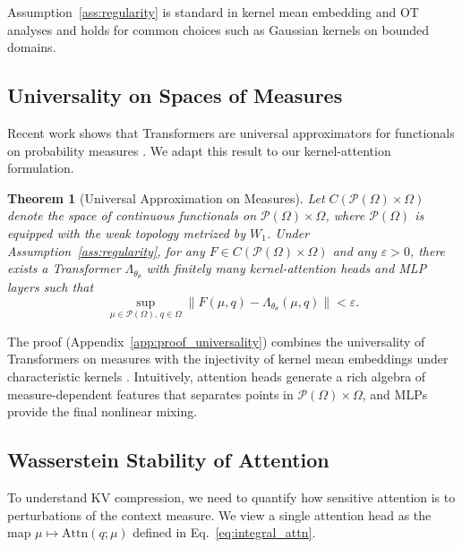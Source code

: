 \documentclass{article}
\theoremstyle{plain}
\newtheorem{theorem}{Theorem}[section]
\theoremstyle{definition}
\theoremstyle{remark}
\newcommand{\OmegaSpace}{\Omega} %
\newcommand{\Pspace}{\mathcal{P}(\OmegaSpace)} %
\newcommand{\Wass}[1]{W_{#1}} %
\newcommand{\Attn}{\text{Attn}}
\newcommand{\LambdaOp}{\Lambda_{\theta}} %
\begin{document}
Assumption~\ref{ass:regularity} is standard in kernel mean embedding and OT analyses  
\citep{muandet2017kernel,sriperumbudur2010hilbert,villani2009optimal,castin2024how} and holds for common choices such as Gaussian kernels on bounded domains.

\subsection{Universality on Spaces of Measures}
\label{sec:theory_universality}

Recent work shows that Transformers are universal approximators for functionals on probability measures \citep{furuya2025transformers}.  
We adapt this result to our kernel-attention formulation.

\begin{theorem}[Universal Approximation on Measures]
\label{thm:universality}
Let $C(\Pspace \times \OmegaSpace)$ denote the space of continuous functionals on $\Pspace \times \OmegaSpace$,  
where $\Pspace$ is equipped with the weak topology metrized by $\Wass{1}$.  
Under Assumption~\ref{ass:regularity}, for any $F \in C(\Pspace \times \OmegaSpace)$ and any $\varepsilon > 0$,  
there exists a Transformer $\LambdaOp_\theta$ with finitely many kernel-attention heads and MLP layers such that
\begin{equation}
    \sup_{\mu \in \Pspace,\, q \in \OmegaSpace}
    \big\| F(\mu,q) - \LambdaOp_\theta(\mu,q) \big\|
    < \varepsilon.
\end{equation}
\end{theorem}

The proof (Appendix~\ref{app:proof_universality}) combines the universality of Transformers on measures \citep{furuya2025transformers}  
with the injectivity of kernel mean embeddings under characteristic kernels \citep{muandet2017kernel,sriperumbudur2010hilbert}.  
Intuitively, attention heads generate a rich algebra of measure-dependent features that separates points in $\Pspace \times \OmegaSpace$,  
and MLPs provide the final nonlinear mixing.

\subsection{Wasserstein Stability of Attention}
\label{sec:theory_lipschitz}

To understand KV compression, we need to quantify how sensitive attention is to perturbations of the context measure.  
We view a single attention head as the map $\mu \mapsto \Attn(q;\mu)$ defined in Eq.~\eqref{eq:integral_attn}.
\end{document}
